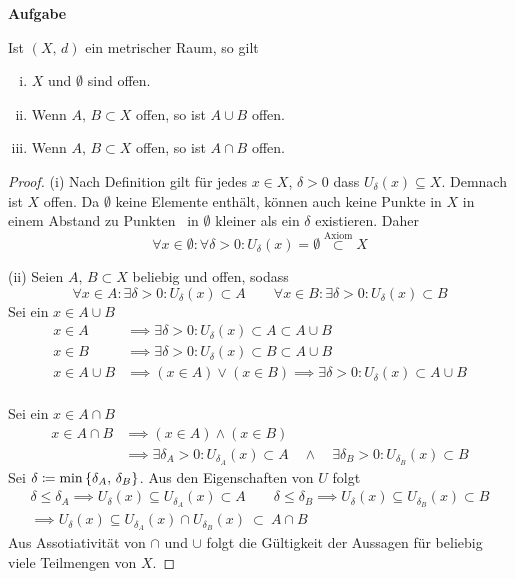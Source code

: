 \documentclass[a4paper, 12pt]{scrartcl}
\newcounter{taski}
\newcommand{\task}{\stepcounter{taski}\textbf{Aufgabe \arabic{taski}}~}
\begin{document}
\task
\begin{theorem}
    Ist $(X,\,d)$ ein metrischer Raum, so gilt
    \begin{enumerate}[(i)]
        \item $X$ und $\emptyset$ sind offen.
        \item Wenn $A,\,B \subset X$ offen, so ist $A \cup B$ offen.
        \item Wenn $A,\,B \subset X$ offen, so ist $A \cap B$ offen.
    \end{enumerate}
\end{theorem}
\begin{proof}
(i) Nach Definition gilt für jedes $x \in X$, $\delta > 0$ dass $U_\delta(x) \subseteq X$. Demnach ist $X$ offen. Da $\emptyset$ keine Elemente enthält, können auch keine Punkte in $X$ in einem Abstand zu \glqq Punkten\grqq~ in $\emptyset$ kleiner als ein $\delta$ existieren. Daher
\[ \forall x \in \emptyset : \forall \delta > 0 : U_\delta(x) = \emptyset \overset{\text{Axiom}}\subset X \]

(ii) Seien $A,\,B \subset X$ beliebig und offen, sodass
\[ \forall x \in A : \exists \delta > 0: U_\delta(x) \subset A \qquad \forall x \in B : \exists \delta > 0: U_\delta(x) \subset B \]
Sei ein $x \in A \cup B$
\begin{align*}
    x \in A &\implies \exists \delta > 0: U_\delta(x) \subset A \subset A \cup B \\
    x \in B &\implies \exists \delta > 0: U_\delta(x) \subset B \subset A \cup B \\
    x \in A \cup B &\implies (x \in A) \vee (x \in B) \implies \exists \delta > 0: U_\delta(x) \subset A \cup B \\
\end{align*}

Sei ein $x \in A \cap B$
\begin{align*}
    x \in A \cap B &\implies (x \in A) \wedge (x \in B) \\
    &\implies \exists \delta_A > 0: U_{\delta_A}(x) \subset A \quad\wedge\quad \exists \delta_B > 0: U_{\delta_B}(x) \subset B
\end{align*}
Sei $\delta \coloneqq \min \qty{\delta_A,\,\delta_B}$. Aus den Eigenschaften von $U$ folgt
\begin{gather*}
    \delta \leq \delta_A \implies U_\delta(x) \subseteq U_{\delta_A}(x) \subset A \qquad  \delta \leq \delta_B \implies U_\delta(x) \subseteq U_{\delta_B}(x) \subset B \\
    \implies U_\delta(x) \subseteq U_{\delta_A}(x) \cap U_{\delta_B}(x) ~\subset~ A \cap B 
\end{gather*}
Aus Assotiativität von $\cap$ und $\cup$ folgt die Gültigkeit der Aussagen für beliebig viele Teilmengen von $X$.
\end{proof}
\end{document}
